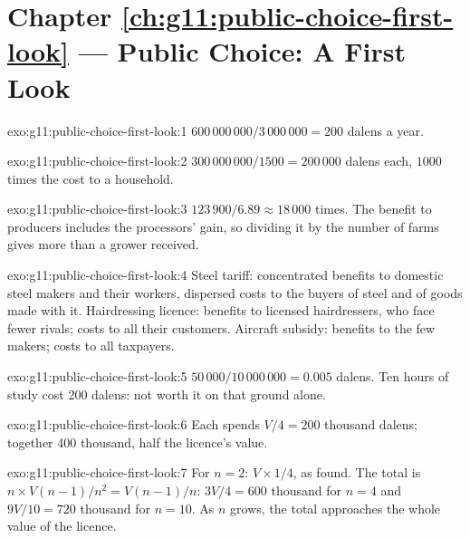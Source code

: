\section*{Chapter \ref{ch:g11:public-choice-first-look} --- Public Choice: A First Look}

\begin{solution}{exo:g11:public-choice-first-look:1}
$600\,000\,000/3\,000\,000 = 200$ dalens a year.
\end{solution}

\begin{solution}{exo:g11:public-choice-first-look:2}
$300\,000\,000/1500 = 200\,000$ dalens each, $1000$ times the cost to a household.
\end{solution}

\begin{solution}{exo:g11:public-choice-first-look:3}
$123\,900/6.89 \approx 18\,000$ times. The benefit to producers includes the processors' gain, so dividing it by the number of farms gives more than a grower received.
\end{solution}

\begin{solution}{exo:g11:public-choice-first-look:4}
Steel tariff: concentrated benefits to domestic steel makers and their workers, dispersed costs to the buyers of steel and of goods made with it. Hairdressing licence:
benefits to licensed hairdressers, who face fewer rivals; costs to all their customers. Aircraft subsidy: benefits to the few makers; costs to all taxpayers.
\end{solution}

\begin{solution}{exo:g11:public-choice-first-look:5}
$50\,000/10\,000\,000 = 0.005$ dalens. Ten hours of study cost 200 dalens: not worth it on that ground alone.
\end{solution}

\begin{solution}{exo:g11:public-choice-first-look:6}
Each spends $V/4 = 200$ thousand dalens; together 400 thousand, half the licence's value.
\end{solution}

\begin{solution}{exo:g11:public-choice-first-look:7}
For $n = 2$: $V \times 1/4$, as found. The total is $n \times V(n-1)/n^2 = V(n-1)/n$: $3V/4 = 600$ thousand for $n = 4$ and $9V/10 = 720$ thousand for $n = 10$. As $n$
grows, the total approaches the whole value of the licence.
\end{solution}

